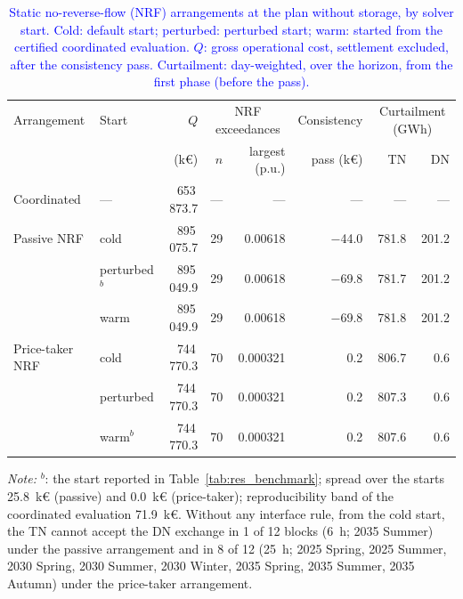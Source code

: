 \documentclass[preprint,12pt]{elsarticle}
\begin{document}
\begin{table}[htbp!]
    \centering
    \caption{\textcolor{blue}{Static no-reverse-flow (NRF) arrangements at the plan without storage, by solver start. Cold: default start; perturbed: perturbed start; warm: started from the certified coordinated evaluation. $Q$: gross operational cost, settlement excluded, after the consistency pass. Curtailment: day-weighted, over the horizon, from the first phase (before the pass).}}
    \label{tab:appE_benchmark}
    \scriptsize\setlength{\tabcolsep}{4pt}
    \begin{tabular}{l l r r r r r r}
        \toprule
        Arrangement & Start & $Q$ & \multicolumn{2}{c}{NRF exceedances} & Consistency & \multicolumn{2}{c}{Curtailment (GWh)} \\
        \cmidrule(lr){4-5}\cmidrule(l){7-8}
         & & (k\euro) & $n$ & largest (p.u.) & pass (k\euro) & TN & DN \\
        \midrule
        Coordinated & --- & 653\,873.7 & --- & --- & --- & --- & --- \\
        \midrule
        Passive NRF & cold & 895\,075.7 & 29 & 0.00618 & $-$44.0 & 781.8 & 201.2 \\
         & perturbed$^{b}$ & 895\,049.9 & 29 & 0.00618 & $-$69.8 & 781.7 & 201.2 \\
         & warm & 895\,049.9 & 29 & 0.00618 & $-$69.8 & 781.8 & 201.2 \\
        \midrule
        Price-taker NRF & cold & 744\,770.3 & 70 & 0.000321 & 0.2 & 806.7 & 0.6 \\
         & perturbed & 744\,770.3 & 70 & 0.000321 & 0.2 & 807.3 & 0.6 \\
         & warm$^{b}$ & 744\,770.3 & 70 & 0.000321 & 0.2 & 807.6 & 0.6 \\
        \bottomrule
    \end{tabular}
    \par\smallskip
    \begin{minipage}{0.95\linewidth}
        \scriptsize\raggedright
        \textit{Note:} $^{b}$: the start reported in Table~\ref{tab:res_benchmark}; spread over the starts 25.8~k\euro{} (passive) and 0.0~k\euro{} (price-taker); reproducibility band of the coordinated evaluation 71.9~k\euro{}. Without any interface rule, from the cold start, the TN cannot accept the DN exchange in 1 of 12 blocks (6~h; 2035 Summer) under the passive arrangement and in 8 of 12 (25~h; 2025 Spring, 2025 Summer, 2030 Spring, 2030 Summer, 2030 Winter, 2035 Spring, 2035 Summer, 2035 Autumn) under the price-taker arrangement.
    \end{minipage}
\end{table}
\end{document}
